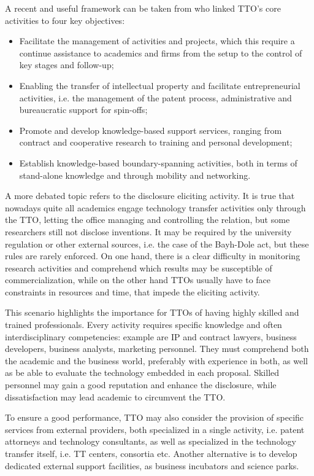 A recent and useful framework can be taken from \citet{Alexander2013} who linked TTO's core activities to four key objectives: 
\begin{itemize}
\item Facilitate the management of activities and projects, which this require a continue assistance to academics and firms from the setup to the control of key stages and follow-up;
\item Enabling the transfer of intellectual property and facilitate entrepreneurial activities, i.e. the management of the patent process, administrative and bureaucratic support for spin-offs;
\item Promote and develop knowledge-based support services, ranging from contract and cooperative research to training and personal development;
\item Establish knowledge-based boundary-spanning activities, both in terms of stand-alone knowledge and through mobility and networking. 
\end{itemize}

A more debated topic refers to the disclosure eliciting activity. It is true that nowadays quite all academics engage technology transfer activities only through the TTO, letting the office managing and controlling the relation, but some researchers still not disclose inventions. It may be required by the university regulation or other external sources, i.e. the case of the Bayh-Dole act, but these rules are rarely enforced. On one hand, there is a clear difficulty in monitoring research activities and comprehend which results may be susceptible of commercialization, while on the other hand TTOs usually have to face constraints in resources and time, that impede the eliciting activity. 

This scenario highlights the importance for TTOs of having highly skilled and trained professionals. Every activity requires specific knowledge and often interdisciplinary competencies: example are IP and contract lawyers, business developers, business analysts, marketing personnel. They must comprehend both the academic and the business world, preferably with experience in both, as well as be able to evaluate the technology embedded in each proposal. Skilled personnel may gain a good reputation and enhance the disclosure, while dissatisfaction may lead academic to circumvent the TTO. 

To ensure a good performance, TTO may also consider the provision of specific services from external providers, both specialized in a single activity, i.e. patent attorneys and technology consultants, as well as specialized in the technology transfer itself, i.e. TT centers, consortia etc. Another alternative is to develop dedicated external support facilities, as business incubators and science parks.

